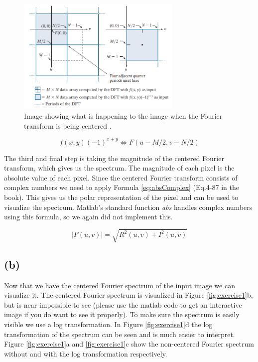 \documentclass{article}
\begin{document}
\begin{figure}[h]
    \centering
    \includegraphics[width=0.7\textwidth]{Assignment_2/output_plots/centered_fourier_spectrum_book.png}
    \caption{Image showing what is happening to the image when the Fourier transform is being centered \cite{gonzalez2008digital}.}
    \label{fig:fouriershiftFromBook}
\end{figure}

\begin{equation}\label{eq:fouriershift}
    f(x, y)(-1)^{x+y} \Leftrightarrow F(u-M / 2, v-N / 2)
\end{equation}

The third and final step is taking the magnitude of the centered Fourier transform, which gives us the spectrum. The magnitude of each pixel is the absolute value of each pixel. Since the centered Fourier transform consists of complex numbers we need to apply Formula \ref{eq:absComplex} (Eq.4-87 in the book). This gives us the polar representation of the pixel and can be used to visualize the spectrum. Matlab's standard function \textit{abs} handles complex numbers using this formula, so we again did not implement this.

\begin{equation}\label{eq:absComplex}
    |F(u, v)|=\sqrt{R^{2}(u, v)+I^{2}(u, v)}
\end{equation}

\newpage
\subsection*{(b)}
Now that we have the centered Fourier spectrum of the input image we can visualize it. The centered Fourier spectrum is visualized in Figure \ref{fig:exercise1}b, but is near impossible to see (please use the matlab code to get an interactive image if you do want to see it properly). To make sure the spectrum is easily visible we use a log transformation. In Figure \ref{fig:exercise1}d the log transformation of the spectrum can be seen and is much easier to interpret. Figure \ref{fig:exercise1}a and \ref{fig:exercise1}c show the non-centered Fourier spectrum without and with the log transformation respectively.
\end{document}
